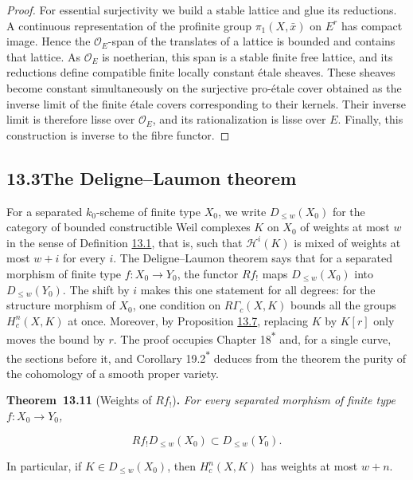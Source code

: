 \documentclass[11pt]{article}
\newenvironment{bpstatement}[2]{\par\addvspace{0.6\baselineskip}\noindent\textbf{#1}#2\textbf{.}\enspace\ignorespaces}
  {\par\addvspace{0.4\baselineskip}}
\newenvironment{bpstatementit}[2]{\begin{bpstatement}{#1}{#2}\itshape\ignorespaces}{\end{bpstatement}}
\newcommand{\bpout}[1]{#1\textsuperscript{\hyperlink{bp-outside}{\ensuremath{\ast}}}}
\begin{document}
\begin{proof}[{Proof}]
For essential surjectivity we build a stable lattice and glue its reductions. A continuous representation of the profinite group \(\pi_1(X,\bar x)\) on \(E^r\) has compact image. Hence the \(\mathcal O_E\)-span of the translates of a lattice is bounded and contains that lattice. As \(\mathcal O_E\) is noetherian, this span is a stable finite free lattice, and its reductions define compatible finite locally constant étale sheaves. These sheaves become constant simultaneously on the surjective pro-étale cover obtained as the inverse limit of the finite étale covers corresponding to their kernels. Their inverse limit is therefore lisse over \(\mathcal O_E\), and its rationalization is lisse over \(E\). Finally, this construction is inverse to the fibre functor.
\end{proof}


\subsection*{\texorpdfstring{13.3\quad The Deligne–Laumon theorem}{13.3 The Deligne–Laumon theorem}}
\label{bp34}%
\label{bp35}%
For a separated \(k_0\)-scheme of finite type \(X_0\), we write \(D_{\leq w}(X_0)\) for the category of bounded constructible Weil complexes \(K\) on \(X_0\) of weights at most \(w\) in the sense of Definition \hyperref[bp7]{13.1}, that is, such that \(\mathcal H^i(K)\) is mixed of weights at most \(w+i\) for every \(i\). The Deligne–Laumon theorem says that for a separated morphism of finite type \(f:X_0\to Y_0\), the functor \(Rf_!\) maps \(D_{\leq w}(X_0)\) into \(D_{\leq w}(Y_0)\). The shift by \(i\) makes this one statement for all degrees: for the structure morphism of \(X_0\), one condition on \(R\Gamma_c(X,K)\) bounds all the groups \(H^n_c(X,K)\) at once. Moreover, by Proposition \hyperref[bp22]{13.7}, replacing \(K\) by \(K[r]\) only moves the bound by \(r\). The proof occupies Chapter \bpout{18} and, for a single curve, the sections before it, and Corollary \bpout{19.2} deduces from the theorem the purity of the cohomology of a smooth proper variety.

\label{bp36}%
\begin{bpstatementit}{Theorem~13.11}{ (Weights of $Rf_!$)}
For every separated morphism of finite type \(f:X_0\to Y_0\),

\[
Rf_!D_{\leq w}(X_0)\subset D_{\leq w}(Y_0).
\]

In particular, if \(K\in D_{\leq w}(X_0)\), then \(H_c^n(X,K)\) has weights at most \(w+n\).
\end{bpstatementit}
\end{document}
